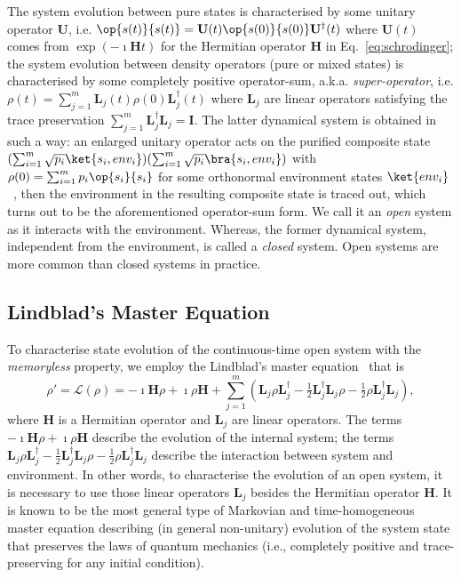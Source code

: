 \documentclass[a4paper,UKenglish,cleveref,autoref,thm-restate,authorcolumns]{lipics-v2019}
\renewcommand{\L}{\mathcal{L}}
\newcommand{\HH}{\mathbf{H}}
\newcommand{\LL}{\mathbf{L}}
\newcommand{\id}{\mathbf{I}}
\begin{document}
The system evolution between pure states is characterised by some unitary operator $\mathbf{U}$,
i.e. $\op{s(t)}{s(t)}=\mathbf{U}(t)\op{s(0)}{s(0)}\mathbf{U}^\dag(t)$
where $\mathbf{U}(t)$ comes from $\exp(-\imath \HH t)$
for the Hermitian operator $\HH$ in Eq.~\eqref{eq:schrodinger};
the system evolution between density operators (pure or mixed states) is characterised
by some completely positive operator-sum, a.k.a. \emph{super-operator},
i.e. $\rho(t)=\sum_{j=1}^m \LL_j(t) \rho(0) \LL_j^\dag(t)$
where $\LL_j$ are linear operators satisfying
the trace preservation $\sum_{j=1}^m \LL_j^\dag \LL_j=\id$.
The latter dynamical system is obtained in such a way:
an enlarged unitary operator acts on the purified composite state
$(\sum_{i=1}^m \sqrt{p_i}\ket{s_i,env_i})(\sum_{i=1}^m \sqrt{p_i}\bra{s_i,env_i})$
with $\rho(0)=\sum_{i=1}^m p_i \op{s_i}{s_i}$
for some orthonormal environment states $\ket{env_i}$~\cite[Section~2.5]{NiC00},
then the environment in the resulting composite state is traced out,
which turns out to be the aforementioned operator-sum form.
We call it an \emph{open} system as it interacts with the environment.
Whereas, the former dynamical system, independent from the environment,
is called a \emph{closed} system.
Open systems are more common than closed systems in practice.


\subsection{Lindblad's Master Equation}\label{S22}
To characterise state evolution of the continuous-time open system with the \emph{memoryless} property,
we employ the Lindblad's master equation~\cite{Lin76,GKS76} that is
\begin{equation}\label{eq:Lindblad}
	\rho'=\L(\rho)
	=-\imath\HH\rho+\imath\rho\HH
	+\sum_{j=1}^m \left(\LL_j\rho \LL_j^\dag
	-\tfrac{1}{2}\LL_j^\dag\LL_j\rho-\tfrac{1}{2}\rho\LL_j^\dag\LL_j\right),
\end{equation}
where $\HH$ is a Hermitian operator and $\LL_j$ are linear operators.
The terms $-\imath\HH\rho+\imath\rho\HH$ describe the evolution of the internal system;
the terms $\LL_j\rho \LL_j^\dag
-\tfrac{1}{2}\LL_j^\dag\LL_j\rho-\tfrac{1}{2}\rho\LL_j^\dag\LL_j$ 
describe the interaction between system and environment.
In other words,
to characterise the evolution of an open system,
it is necessary to use those linear operators $\LL_j$ besides the Hermitian operator $\HH$.
It is known to be the most general type of Markovian and time-homogeneous master equation
describing (in general non-unitary) evolution of the system state
that preserves the laws of quantum mechanics
(i.e., completely positive and trace-preserving for any initial condition).
\end{document}
